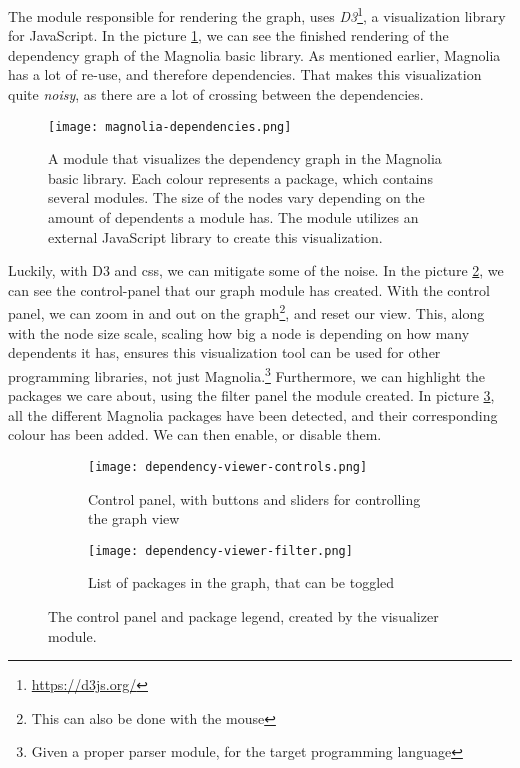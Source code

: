 The module responsible for rendering the graph, uses
\textit{D3}\footnote{\url{https://d3js.org/}}, a visualization library for
JavaScript. In the picture \ref{pic:magLib}, we can see the finished rendering
of the dependency graph of the Magnolia basic library. As mentioned earlier,
Magnolia has a lot of re-use, and therefore dependencies. That makes this
visualization quite \textit{noisy}, as there are a lot of crossing between the
dependencies.

\begin{figure}[H]
  \centering
  \texttt{[image: magnolia-dependencies.png]}
  \caption{
    A module that visualizes the dependency graph in the Magnolia basic library.
    Each colour represents a package, which contains several modules. The size
    of the nodes vary depending on the amount of dependents a module has. The
    module utilizes an external JavaScript library to create this visualization.
  }
  \label{pic:magLib}
\end{figure}

Luckily, with D3 and \gls*{css}, we can mitigate some of the noise. In the
picture \ref{pic:depCont}, we can see the control-panel that our graph module
has created. With the control panel, we can zoom in and out on the graph\footnote{This can also be done with the mouse},
and reset our view. This, along with the node size scale, scaling how big
a node is depending on how many dependents it has, ensures this visualization
tool can be used for other programming libraries, not just Magnolia.\footnote{Given a proper parser module, for the target programming language}
Furthermore, we can highlight the packages we care about, using the filter
panel the module created. In picture \ref{pic:depFil}, all the different
Magnolia packages have been detected, and their corresponding colour has been
added. We can then enable, or disable them.

\begin{figure}[H]
  \begin{subfigure}[h]{0.45\textwidth}
    \centering
    \texttt{[image: dependency-viewer-controls.png]}
    \caption{
      Control panel, with buttons and sliders for controlling the graph view
    }
  \label{pic:depCont}
  \end{subfigure}
  \hfill
  \begin{subfigure}[h]{0.45\textwidth}
    \centering
    \texttt{[image: dependency-viewer-filter.png]}
    \caption{List of packages in the graph, that can be toggled}
    \label{pic:depFil}
  \end{subfigure}
  \caption{
    The control panel and package legend, created by the visualizer module.
  }
  \label{fig:foobarbar}
\end{figure}

